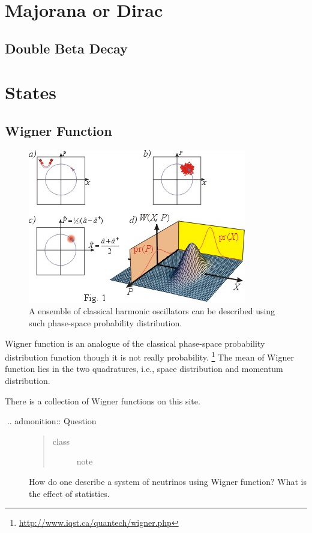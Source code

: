 \documentclass[letterpaper,12pt,english]{sphinxmanual}
\begin{document}
\section{Majorana or Dirac}
\label{preliminary:majorana-or-dirac}

\subsection{Double Beta Decay}
\label{preliminary:double-beta-decay}

\section{States}
\label{preliminary:states}

\subsection{Wigner Function}
\label{preliminary:wigner-function}\label{preliminary:index-2}\begin{figure}[htbp]
\centering
\capstart

\includegraphics{classicalProbDist.jpg}
\caption{A ensemble of classical harmonic oscillators can be described using such phase-space probability distribution.}\end{figure}

Wigner function is an analogue of the classical phase-space probability distribution function though it is not really probability. \footnote{
\href{http://www.iqst.ca/quantech/wigner.php}{http://www.iqst.ca/quantech/wigner.php}
} The mean of Wigner function lies in the two quadratures, i.e., space distribution and momentum distribution.

There is a collection of Wigner functions on this site. \footnotemark[3]
\begin{description}
\item[{.. admonition:: Question}] \leavevmode\begin{quote}\begin{description}
\item[{class}] \leavevmode
note

\end{description}\end{quote}

How do one describe a system of neutrinos using Wigner function? What is the effect of statistics.

\end{description}
\end{document}
